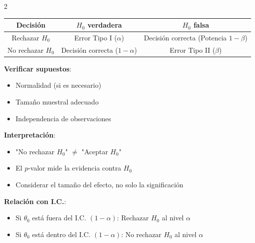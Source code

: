 \documentclass[10pt,a4paper]{article}
\begin{document}
\begin{multicols}{2}
    \begin{tcolorbox}[title=Tabla de Decisión, equal height group=CH6]
        \begin{center}
        \begin{tabular}{|c|c|c|}
        \hline
        \textbf{Decisión} & \textbf{$H_0$ verdadera} & \textbf{$H_0$ falsa} \\
        \hline
        Rechazar $H_0$ & Error Tipo I ($\alpha$) & Decisión correcta (Potencia $1-\beta$) \\
        \hline
        No rechazar $H_0$ & Decisión correcta ($1-\alpha$) & Error Tipo II ($\beta$) \\
        \hline
        \end{tabular}
        \end{center}
    \end{tcolorbox}
    \begin{tcolorbox}[title=Consideraciones Importantes, equal height group=CH6]
        \textbf{Verificar supuestos}:
        \begin{itemize}
            \item Normalidad (si es necesario)
            \item Tamaño muestral adecuado
            \item Independencia de observaciones
        \end{itemize}
        
        \textbf{Interpretación}:
        \begin{itemize}
            \item "No rechazar $H_0$" $\neq$ "Aceptar $H_0$"
            \item El $p$-valor mide la evidencia contra $H_0$
            \item Considerar el tamaño del efecto, no solo la significación
        \end{itemize}
        
        \textbf{Relación con I.C.}:
        \begin{itemize}
            \item Si $\theta_0$ está fuera del I.C. $(1-\alpha)$: Rechazar $H_0$ al nivel $\alpha$
            \item Si $\theta_0$ está dentro del I.C. $(1-\alpha)$: No rechazar $H_0$ al nivel $\alpha$
        \end{itemize}
    \end{tcolorbox}
\end{multicols}
\end{document}

